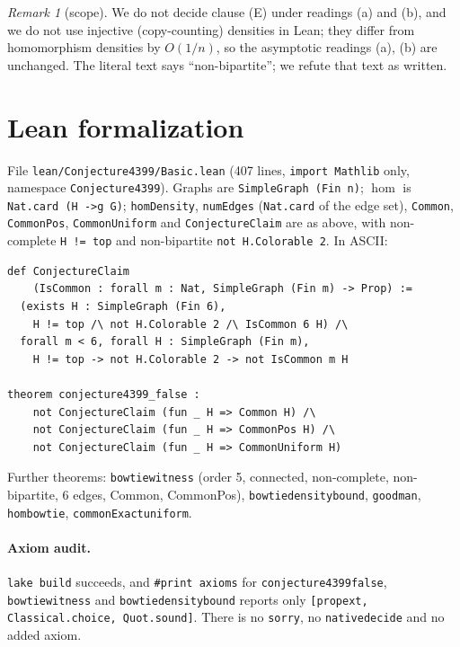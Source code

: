 \documentclass[11pt]{article}
\theoremstyle{definition}
\theoremstyle{remark}
\newtheorem{remark}[theorem]{Remark}
\renewcommand{\_}{\oldus\allowbreak}
\begin{document}
\begin{remark}[scope]
We do not decide clause (E) under readings (a) and (b), and we do not use injective (copy-counting) densities in
Lean; they differ from homomorphism densities by $O(1/n)$, so the asymptotic readings (a), (b) are unchanged.
The literal text says ``non-bipartite''; we refute that text as written.
\end{remark}

\section{Lean formalization}

File \texttt{lean/Conjecture4399/Basic.lean} (407 lines, \texttt{import Mathlib} only, namespace
\texttt{Conjecture4399}). Graphs are \texttt{SimpleGraph (Fin n)}; $\hom$ is \texttt{Nat.card (H ->g G)};
\texttt{homDensity}, \texttt{numEdges} (\texttt{Nat.card} of the edge set), \texttt{Common}, \texttt{CommonPos},
\texttt{CommonUniform} and \texttt{ConjectureClaim} are as above, with non-complete \texttt{H != top} and
non-bipartite \texttt{not H.Colorable 2}. In ASCII:
\begin{verbatim}
def ConjectureClaim
    (IsCommon : forall m : Nat, SimpleGraph (Fin m) -> Prop) :=
  (exists H : SimpleGraph (Fin 6),
    H != top /\ not H.Colorable 2 /\ IsCommon 6 H) /\
  forall m < 6, forall H : SimpleGraph (Fin m),
    H != top -> not H.Colorable 2 -> not IsCommon m H

theorem conjecture4399_false :
    not ConjectureClaim (fun _ H => Common H) /\
    not ConjectureClaim (fun _ H => CommonPos H) /\
    not ConjectureClaim (fun _ H => CommonUniform H)
\end{verbatim}
Further theorems: \texttt{bowtie\_witness} (order 5, connected, non-complete, non-bipartite, 6 edges, Common,
CommonPos), \texttt{bowtie\_density\_bound}, \texttt{goodman}, \texttt{hom\_bowtie}, \texttt{commonExact\_uniform}.

\paragraph{Axiom audit.} \texttt{lake build} succeeds, and \texttt{\#print axioms} for
\texttt{conjecture4399\_false}, \texttt{bowtie\_witness} and \texttt{bowtie\_density\_bound} reports only
\texttt{[propext, Classical.choice, Quot.sound]}. There is no \texttt{sorry}, no \texttt{native\_decide} and no
added axiom.
\end{document}

